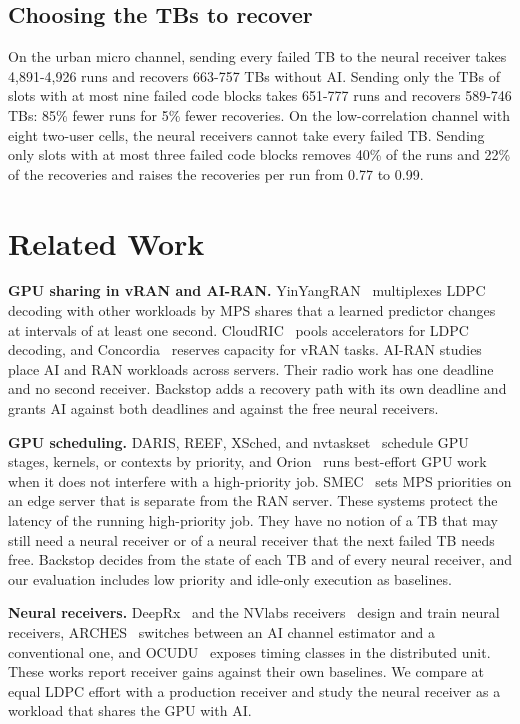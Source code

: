 \documentclass[acmsmall,screen,review,anonymous]{acmart}
\newcommand{\sys}{Backstop\xspace}
\begin{document}
\subsection{Choosing the TBs to recover}

On the urban micro channel, sending every failed TB to the neural receiver takes 4,891-4,926 runs and
recovers 663-757 TBs without AI. Sending only the TBs of slots with at most nine failed code blocks takes
651-777 runs and recovers 589-746 TBs: 85\% fewer runs for 5\% fewer recoveries. On the low-correlation
channel with eight two-user cells, the neural receivers cannot take every failed TB. Sending only slots
with at most three failed code blocks removes 40\% of the runs and 22\% of the recoveries and raises the
recoveries per run from 0.77 to 0.99.

\section{Related Work}

\noindent\textbf{GPU sharing in vRAN and AI-RAN.} YinYangRAN~\cite{yinyangran} multiplexes LDPC decoding
with other workloads by MPS shares that a learned predictor changes at intervals of at least one second.
CloudRIC~\cite{cloudric} pools accelerators for LDPC decoding, and Concordia~\cite{concordia} reserves
capacity for vRAN tasks. AI-RAN studies~\cite{interplay,caora,haf,distributedairan} place AI and RAN
workloads across servers. Their radio work has one deadline and no second receiver. \sys adds a recovery
path with its own deadline and grants AI against both deadlines and against the free neural receivers.

\noindent\textbf{GPU scheduling.} DARIS, REEF, XSched, and nvtaskset~\cite{daris,reef,xsched,nvtaskset}
schedule GPU stages, kernels, or contexts by priority, and Orion~\cite{orion} runs best-effort GPU work when
it does not interfere with a high-priority job. SMEC~\cite{smec} sets MPS priorities on an edge server that
is separate from the RAN server. These systems protect the latency of the running high-priority job. They
have no notion of a TB that may still need a neural receiver or of a neural receiver that the next failed
TB needs free. \sys decides from the state of each TB and of every neural receiver, and our evaluation
includes low priority and idle-only execution as baselines.

\noindent\textbf{Neural receivers.} DeepRx~\cite{deeprx} and the NVlabs receivers~\cite{nrx5g,nrxrt} design
and train neural receivers, ARCHES~\cite{arches} switches between an AI channel estimator and a conventional
one, and OCUDU~\cite{ocudu} exposes timing classes in the distributed unit. These works report receiver
gains against their own baselines. We compare at equal LDPC effort with a production receiver and study the
neural receiver as a workload that shares the GPU with AI.
\end{document}
